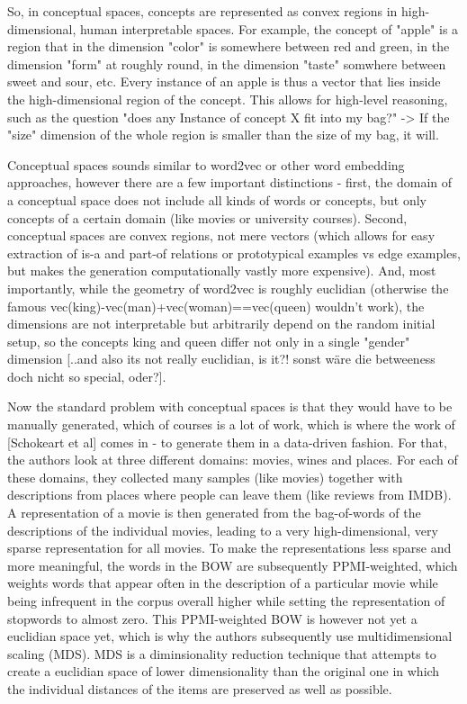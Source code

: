 \documentclass[11pt,
  paper=a4, 
  hidelinks,
  bibliography=totocnumbered,
	captions=tableheading,
	BCOR=10mm
]{scrreprt}
\theoremstyle{definition}
\begin{document}
So, in conceptual spaces, concepts are represented as convex regions in high-dimensional, human interpretable spaces. For example, the concept of "apple" is a region that in the dimension "color" is somewhere between red and green, in the dimension "form" at roughly round, in the dimension "taste" somwhere between sweet and sour, etc. 
Every instance of an apple is thus a vector that lies inside the high-dimensional region of the concept. This allows for high-level reasoning, such as the question "does any Instance of concept X fit into my bag?" -> If the "size" dimension of the whole region is smaller than the size of my bag, it will.

Conceptual spaces sounds similar to word2vec or other word embedding approaches, however there are a few important distinctions - first, the domain of a conceptual space does not include all kinds of words or concepts, but only concepts of a certain domain (like movies or university courses). 
Second, conceptual spaces are convex regions, not mere vectors (which allows for easy extraction of is-a and part-of relations or prototypical examples vs edge examples, but makes the generation computationally vastly more expensive). And, most importantly, while the geometry of word2vec is roughly euclidian (otherwise the famous vec(king)-vec(man)+vec(woman)==vec(queen) wouldn't work), the dimensions are not interpretable but arbitrarily depend on the random initial setup, so the concepts king and queen differ not only in a single "gender" dimension [..and also its not really euclidian, is it?! sonst wäre die betweeness doch nicht so special, oder?].

Now the standard problem with conceptual spaces is that they would have to be manually generated, which of courses is a lot of work, which is where the work of [Schokeart et al] comes in - to generate them in a data-driven fashion.
For that, the authors look at three different domains: movies, wines and places. For each of these domains, they collected many samples (like movies) together with descriptions from places where people can leave them (like reviews from IMDB). A representation of a movie is then generated from the bag-of-words of the descriptions of the individual movies, leading to a very high-dimensional, very sparse representation for all movies. 
To make the representations less sparse and more meaningful, the words in the BOW are subsequently PPMI-weighted, which weights words that appear often in the description of a particular movie while being infrequent in the corpus overall higher while setting the representation of stopwords to almost zero. 
This PPMI-weighted BOW is however not yet a euclidian space yet, which is why the authors subsequently use multidimensional scaling (MDS). MDS is a diminsionality reduction technique that attempts to create a euclidian space of lower dimensionality than the original one in which the individual distances of the items are preserved as well as possible. 
\end{document}
